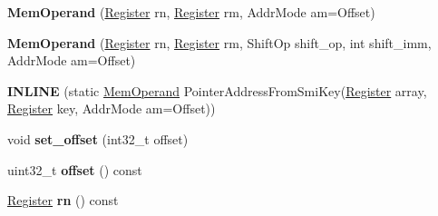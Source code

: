 \begin{DoxyCompactItemize}
\item 
{\bfseries Mem\+Operand} (\hyperlink{structv8_1_1internal_1_1_register}{Register} rn, \hyperlink{structv8_1_1internal_1_1_register}{Register} rm, Addr\+Mode am=Offset)\hypertarget{classv8_1_1internal_1_1_b_a_s_e___e_m_b_e_d_d_e_d_a068f0965ac4605f7ee179f2bd3600702}{}\label{classv8_1_1internal_1_1_b_a_s_e___e_m_b_e_d_d_e_d_a068f0965ac4605f7ee179f2bd3600702}

\item 
{\bfseries Mem\+Operand} (\hyperlink{structv8_1_1internal_1_1_register}{Register} rn, \hyperlink{structv8_1_1internal_1_1_register}{Register} rm, Shift\+Op shift\+\_\+op, int shift\+\_\+imm, Addr\+Mode am=Offset)\hypertarget{classv8_1_1internal_1_1_b_a_s_e___e_m_b_e_d_d_e_d_a410758fd23b246391fabe0f68bf096a1}{}\label{classv8_1_1internal_1_1_b_a_s_e___e_m_b_e_d_d_e_d_a410758fd23b246391fabe0f68bf096a1}

\item 
{\bfseries I\+N\+L\+I\+NE} (static \hyperlink{classv8_1_1internal_1_1_mem_operand}{Mem\+Operand} Pointer\+Address\+From\+Smi\+Key(\hyperlink{structv8_1_1internal_1_1_register}{Register} array,                                                                                                                                                                                                       \hyperlink{structv8_1_1internal_1_1_register}{Register} key,                                                                                                                                                                                                       Addr\+Mode am=Offset))\hypertarget{classv8_1_1internal_1_1_b_a_s_e___e_m_b_e_d_d_e_d_a569be72e4504b48ff1cb777e97b35673}{}\label{classv8_1_1internal_1_1_b_a_s_e___e_m_b_e_d_d_e_d_a569be72e4504b48ff1cb777e97b35673}

\item 
void {\bfseries set\+\_\+offset} (int32\+\_\+t offset)\hypertarget{classv8_1_1internal_1_1_b_a_s_e___e_m_b_e_d_d_e_d_a9ff4fa66cabe515aafbfdc0439c7db5a}{}\label{classv8_1_1internal_1_1_b_a_s_e___e_m_b_e_d_d_e_d_a9ff4fa66cabe515aafbfdc0439c7db5a}

\item 
uint32\+\_\+t {\bfseries offset} () const \hypertarget{classv8_1_1internal_1_1_b_a_s_e___e_m_b_e_d_d_e_d_a04ebdcbc45f3496eae303a85974db071}{}\label{classv8_1_1internal_1_1_b_a_s_e___e_m_b_e_d_d_e_d_a04ebdcbc45f3496eae303a85974db071}

\item 
\hyperlink{structv8_1_1internal_1_1_register}{Register} {\bfseries rn} () const \hypertarget{classv8_1_1internal_1_1_b_a_s_e___e_m_b_e_d_d_e_d_aafc174fa57af8711b06f3b0e356c070c}{}\label{classv8_1_1internal_1_1_b_a_s_e___e_m_b_e_d_d_e_d_aafc174fa57af8711b06f3b0e356c070c}


\end{DoxyCompactItemize}
